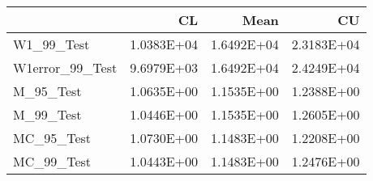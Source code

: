 \begin{tabular}{lrrr}
\toprule
{} &         CL &       Mean &         CU \\
\midrule
W1\_99\_Test      & 1.0383E+04 & 1.6492E+04 & 2.3183E+04 \\
W1error\_99\_Test & 9.6979E+03 & 1.6492E+04 & 2.4249E+04 \\
M\_95\_Test       & 1.0635E+00 & 1.1535E+00 & 1.2388E+00 \\
M\_99\_Test       & 1.0446E+00 & 1.1535E+00 & 1.2605E+00 \\
MC\_95\_Test      & 1.0730E+00 & 1.1483E+00 & 1.2208E+00 \\
MC\_99\_Test      & 1.0443E+00 & 1.1483E+00 & 1.2476E+00 \\
\bottomrule
\end{tabular}
